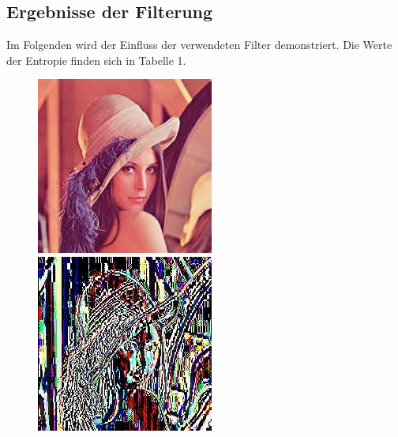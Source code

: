 \documentclass[a4paper,12pt]{article}
\begin{document}
\subsection{Ergebnisse der Filterung}
Im Folgenden wird der Einfluss der verwendeten Filter demonstriert. Die Werte der Entropie finden sich in Tabelle 1.
\par
\begin{figure}[h]
    \centering
\begin{minipage}[h]{.45\linewidth}
\centering
\includegraphics[width=0.55\linewidth]{preconditioning/lena}
\end{minipage}
\hfill
\begin{minipage}[h]{.45\linewidth}
\centering
\includegraphics[width=0.55\linewidth]{preconditioning/lena_sub}
\end{minipage}
\end{figure}
\end{document}
